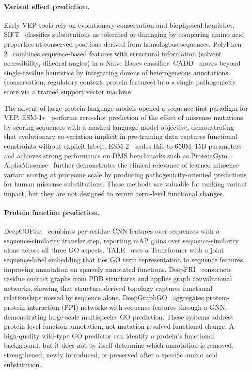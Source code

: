 \documentclass[11pt,a4paper]{article}
\begin{document}
\paragraph{Variant effect prediction.}
Early VEP tools rely on evolutionary conservation and biophysical heuristics. SIFT~\cite{ng2001predicting} classifies substitutions as tolerated or damaging by comparing amino acid properties at conserved positions derived from homologous sequences. PolyPhen-2~\cite{adzhubei2010method} combines sequence-based features with structural information (solvent accessibility, dihedral angles) in a Naive Bayes classifier. CADD~\cite{kircher2014general} moves beyond single-residue heuristics by integrating dozens of heterogeneous annotations (conservation, regulatory context, protein features) into a single pathogenicity score via a trained support vector machine.

The advent of large protein language models opened a sequence-first paradigm for VEP. ESM-1v~\cite{meier2021language} performs zero-shot prediction of the effect of missense mutations by scoring sequences with a masked-language-model objective, demonstrating that evolutionary co-variation implicit in pre-training data captures functional constraints without explicit labels. ESM-2~\cite{lin2023evolutionary} scales this to 650M--15B parameters and achieves strong performance on DMS benchmarks such as ProteinGym~\cite{notin2023proteingym}. AlphaMissense~\cite{cheng2023alphamissense} further demonstrates the clinical relevance of learned missense-variant scoring at proteome scale by producing pathogenicity-oriented predictions for human missense substitutions. These methods are valuable for ranking variant impact, but they are not designed to return term-level functional changes.

\paragraph{Protein function prediction.}
DeepGOPlus~\cite{kulmanov2019deepgoplus} combines per-residue CNN features over sequences with a sequence-similarity transfer step, reporting mAP gains over sequence-similarity alone across all three GO aspects. TALE~\cite{cao2021tale} uses a Transformer with a joint sequence-label embedding that ties GO term representation to sequence features, improving annotation on sparsely annotated functions. DeepFRI~\cite{gligorijevic2021structure} constructs residue contact graphs from PDB structures and applies graph convolutional networks, showing that structure-derived topology captures functional relationships missed by sequence alone. DeepGraphGO~\cite{zhang2021deepgraphgo} aggregates protein-protein interaction (PPI) networks with sequence features through a GNN, demonstrating large-scale multispecies GO prediction. These systems address protein-level function annotation, not mutation-resolved functional change. A high-quality wild-type GO predictor can identify a protein's functional background, but it does not by itself determine which annotation is removed, strengthened, newly introduced, or preserved after a specific amino acid substitution.
\end{document}
